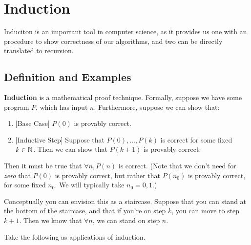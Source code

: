 \section{Induction}

Induciton is an important tool in computer science, as it provides us one with
an procedure to show correctness of our algorithms, and two can be directly
translated to recursion.

\subsection{Definition and Examples}

\begin{definition*}

\textbf{Induction} is a mathematical proof technique. Formally, suppose we have
some program $P$, which has input $n$. Furthermore, suppose we can show that:
\begin{enumerate}[1)]
\item $[$Base Case$]$ $P(0)$ is provably correct.
\item $[$Inductive Step$]$ Suppose that $P(0), \dots, P(k)$ is correct for some
fixed $k \in \mathbb{N}$.  Then we can show that $P(k+1)$ is provably correct.
\end{enumerate}
Then it must be true that $\forall n, P(n)$ is correct. (Note that we don't need
for \textit{zero} that $P(0)$ is provably correct, but rather that $P(n_0)$ is
provably correct, for some fixed $n_0$. We will typically take $n_0 = 0, 1$.)

Conceptually you can envision this as a staircase. Suppose that you can stand at
the bottom of the staircase, and that if you're on step $k$, you can move to
step $k+1$. Then we know that $\forall n$, we can stand on step $n$.

\end{definition*}

Take the following as applications of induction.

